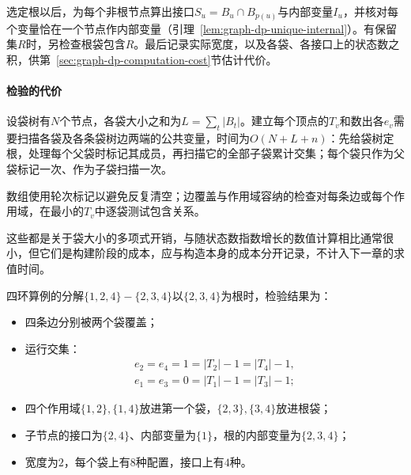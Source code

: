 选定根以后，为每个非根节点算出接口$S_u=B_u\cap B_{p(u)}$与内部变量$I_u$，并核对每个变量恰在一个节点作内部变量（引理~\ref{lem:graph-dp-unique-internal}）。有保留集$R$时，另检查根袋包含$R$。最后记录实际宽度，以及各袋、各接口上的状态数之积，供第~\ref{sec:graph-dp-computation-cost}节估计代价。

\paragraph{检验的代价}
设袋树有$N$个节点，各袋大小之和为$L=\sum_t|B_t|$。建立每个顶点的$T_v$和数出各$e_v$需要扫描各袋及各条袋树边两端的公共变量，时间为$O(N+L+n)$：先给袋树定根，处理每个父袋时标记其成员，再扫描它的全部子袋累计交集；每个袋只作为父袋标记一次、作为子袋扫描一次。

数组使用轮次标记以避免反复清空；边覆盖与作用域容纳的检查对每条边或每个作用域，在最小的$T_v$中逐袋测试包含关系。

这些都是关于袋大小的多项式开销，与随状态数指数增长的数值计算相比通常很小，但它们是构建阶段的成本，应与构造本身的成本分开记录，不计入下一章的求值时间。

四环算例的分解$\{1,2,4\}-\{2,3,4\}$以$\{2,3,4\}$为根时，检验结果为：
\begin{itemize}
  \item 四条边分别被两个袋覆盖；
  \item 运行交集：
  \[
  \begin{gathered}
  e_2=e_4=1=|T_2|-1=|T_4|-1,\\
  e_1=e_3=0=|T_1|-1=|T_3|-1;
  \end{gathered}
  \]
  \item 四个作用域$\{1,2\},\{1,4\}$放进第一个袋，$\{2,3\},\{3,4\}$放进根袋；
  \item 子节点的接口为$\{2,4\}$、内部变量为$\{1\}$，根的内部变量为$\{2,3,4\}$；
  \item 宽度为$2$，每个袋上有$8$种配置，接口上有$4$种。
\end{itemize}
